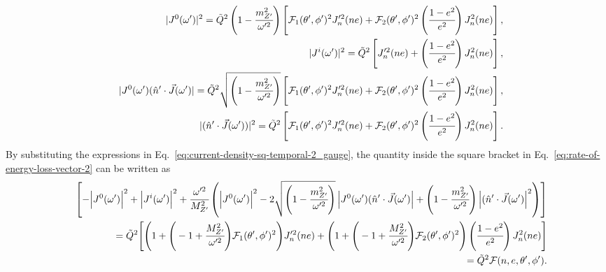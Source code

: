 \documentclass[aps,prd]{revtex4-2}
\begin{document}
\begin{eqnarray}\label{eq:current-density-sq-temporal-2_gauge}
        &&|J^0(\omega^{\prime})|^2 = \tilde{Q}^{2}\left(1- \cfrac{m_{Z^{\prime}}^{2}}{\omega^{\prime 2}}\right)
         \left[\mathcal{F}_{1} (\theta^\prime, \phi^\prime)^{2}  J^{\prime 2}_{n}(ne) + \mathcal{F}_{2} (\theta^\prime, \phi^\prime)^{2} \left(\cfrac{1-e^{2}}{e^{2}}\right) J^{2}_{n}(ne)  \right], \nonumber \\
       && |J^i(\omega^{\prime})|^2 = \tilde{Q}^{2}
     \left[J^{\prime 2}_{n}(ne) + \left(\cfrac{1-e^{2}}{e^{2}}\right) J^{2}_{n}(ne)  \right], \nonumber \\
     &&|J^0(\omega^{\prime})(\hat{n}^{\prime}\cdot \vec{J}(\omega^{\prime})| = \tilde{Q}^{2}\sqrt{\left( 1- \cfrac{m_{Z^{\prime}}^{2}}{\omega^{\prime 2}}\right)} \left[\mathcal{F}_{1} (\theta^\prime, \phi^\prime)^{2} J^{\prime 2}_{n}(ne) + \mathcal{F}_{2} (\theta^\prime, \phi^\prime)^{2} \left(\cfrac{1-e^{2}}{e^{2}}\right)J^{2}_{n}(ne)  \right], \nonumber \\
        &&|(\hat{n}^{\prime}\cdot \vec{J}(\omega^{\prime}))|^{2} = \tilde{Q}^{2}
        \left[\mathcal{F}_{1} (\theta^\prime, \phi^\prime)^{2}  J^{\prime 2}_{n}(ne) + \mathcal{F}_{2} (\theta^\prime, \phi^\prime)^{2} \left(\cfrac{1-e^{2}}{e^{2}}\right) J^{2}_{n}(ne) \right].
\end{eqnarray}
By substituting the expressions in Eq.~\eqref{eq:current-density-sq-temporal-2_gauge}, the quantity inside the square bracket in Eq.~\eqref{eq:rate-of-energy-loss-vector-2} can be written as
\begin{eqnarray}\label{eq:current-density-vector-3_gauge}
    &&\left[-\Big|J^{0}(\omega^{\prime})\Big|^2 + \Big|J^{i}(\omega^{\prime})\Big|^2 + \cfrac{\omega^{\prime 2}}{M_{Z^{\prime}}^{2}}\left(\Big|J^{0}(\omega^{\prime})\Big|^2 - 2 \sqrt{\left( 1- \cfrac{m_{Z^{\prime}}^{2}}{\omega^{\prime 2}}\right)}\,\Big|J^0(\omega^{\prime})(\hat{n}^{\prime}\cdot \vec{J}(\omega^{\prime})\Big|
   + \left( 1- \cfrac{m_{Z^{\prime}}^{2}}{\omega^{\prime 2}}\right)\Big|(\hat{n}^{\prime}\cdot \vec{J}(\omega^{\prime})\Big|^{2}\right) \right] \nonumber \\
    && = \tilde{Q}^{2}\Bigg[\Bigg(1 + \Bigg(-1+ \cfrac{M_{Z^{\prime}}^{2}}{\omega^{\prime 2}}  \Bigg)\mathcal{F}_{1} (\theta^\prime, \phi^\prime)^2 \Bigg) J^{\prime 2}_{n}(ne) + \Bigg(1 + \Bigg(-1+ \cfrac{M_{Z^{\prime}}^{2}}{\omega^{\prime 2}}  \Bigg)\mathcal{F}_{2} (\theta^\prime, \phi^\prime)^2 \Bigg) \left(\cfrac{1-e^{2}}{e^{2}}\right) J^{2}_{n}(ne) \Bigg] \nonumber \\
   && = \tilde{Q}^{2} \mathcal{F}(n, e, \theta^{\prime}, \phi^{\prime}).
\end{eqnarray}
\end{document}
